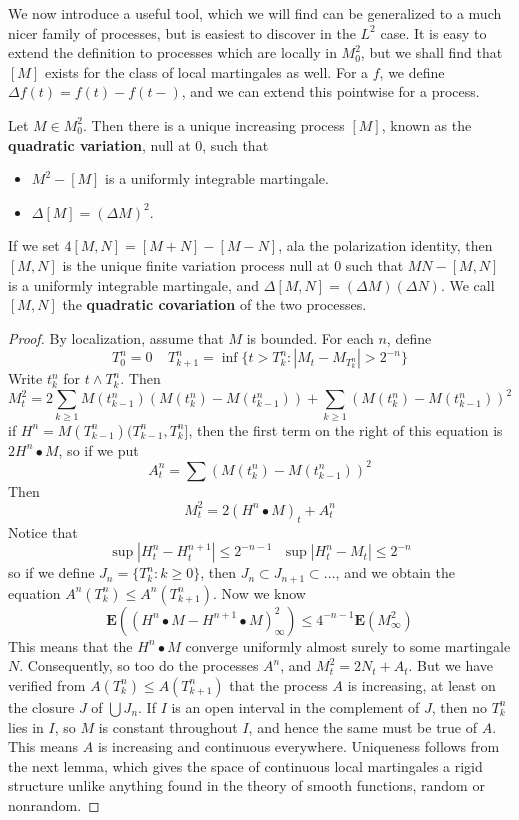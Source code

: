 We now introduce a useful tool, which we will find can be generalized to a much nicer family of processes, but is easiest to discover in the $L^2$ case. It is easy to extend the definition to processes which are locally in $M^2_0$, but we shall find that $[M]$ exists for the class of local martingales as well. For a \cadlag $f$, we define $\Delta f(t) = f(t) - f(t-)$, and we can extend this pointwise for a \cadlag process.

\begin{theorem}
    Let $M \in M^2_0$. Then there is a unique increasing \cadlag process $[M]$, known as the {\bf quadratic variation}, null at 0, such that
    \begin{itemize}
        \item $M^2 - [M]$ is a uniformly integrable martingale.
        \item $\Delta [M] = (\Delta M)^2$.
    \end{itemize}
    If we set $4[M,N] = [M + N] - [M - N]$, ala the polarization identity, then $[M,N]$ is the unique finite variation process null at 0 such that $MN - [M,N]$ is a uniformly integrable martingale, and $\Delta [M,N] = (\Delta M)(\Delta N)$. We call $[M,N]$ the {\bf quadratic covariation} of the two processes.
\end{theorem}
\begin{proof}
    By localization, assume that $M$ is bounded. For each $n$, define
    \[ T^n_0 = 0\ \ \ \ \ T^n_{k+1} = \inf \{ t > T^n_k : |M_t - M_{T^n_k}| > 2^{-n} \} \]
    Write $t^n_k$ for $t \wedge T^n_k$. Then
    \[ M_t^2 = 2 \sum_{k \geq 1} M(t^n_{k-1}) (M(t^n_k) - M(t^n_{k-1})) + \sum_{k \geq 1} (M(t^n_k) - M(t^n_{k-1}))^2 \]
    if $H^n = M(T^n_{k-1})(T^n_{k-1}, T^n_k]$, then the first term on the right of this equation is $2 H^n \bullet M$, so if we put
    \[ A^n_t = \sum (M(t^n_k) - M(t^n_{k-1}))^2 \]
    Then
    \[ M_t^2 = 2(H^n \bullet M)_t + A^n_t \]
    Notice that
    \[ \sup |H^n_t - H^{n+1}_t| \leq 2^{-n-1}\ \ \ \sup |H^n_t - M_t| \leq 2^{-n} \]
    so if we define $J_n = \{ T^n_k : k \geq 0 \}$, then $J_n \subset J_{n+1} \subset \dots$, and we obtain the equation $A^n(T^n_k) \leq A^n(T^n_{k+1})$. Now we know
    \[ \mathbf{E}((H^n \bullet M - H^{n+1} \bullet M)_\infty^2) \leq 4^{-n-1} \mathbf{E}(M_\infty^2) \]
    This means that the $H^n \bullet M$ converge uniformly almost surely to some martingale $N$. Consequently, so too do the processes $A^n$, and $M_t^2 = 2N_t + A_t$. But we have verified from $A(T^n_k) \leq A(T^n_{k+1})$ that the process $A$ is increasing, at least on the closure $J$ of $\bigcup J_n$. If $I$ is an open interval in the complement of $J$, then no $T^n_k$ lies in $I$, so $M$ is constant throughout $I$, and hence the same must be true of $A$. This means $A$ is increasing and continuous everywhere. Uniqueness follows from the next lemma, which gives the space of continuous local martingales a rigid structure unlike anything found in the theory of smooth functions, random or nonrandom.
\end{proof}

